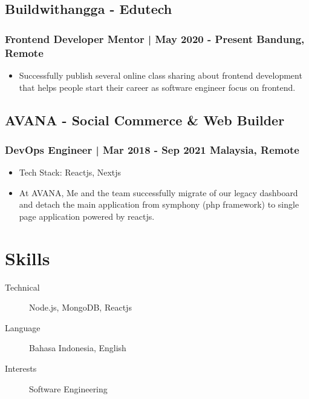 \documentclass[11pt]{article}
\begin{document}
\subsection{Buildwithangga - Edutech}
\subsubsection{Frontend Developer Mentor | May 2020 - Present \hfill Bandung, Remote}
\begin{itemize}
    \item Successfully publish several online class sharing about frontend development that helps people start their career as software engineer focus on frontend.
\end{itemize}

\subsection{AVANA - Social Commerce \& Web Builder}
\subsubsection{DevOps Engineer | Mar 2018 - Sep 2021 \hfill Malaysia, Remote}
\begin{itemize}
    \item Tech Stack: Reactjs, Nextjs
    \item At AVANA, Me and the team successfully migrate of our legacy dashboard and detach the main application from symphony (php framework) to single page application powered by reactjs.
\end{itemize}

\section{Skills}
\begin{description}
    \item[Technical] Node.js, MongoDB, Reactjs
    \item[Language] Bahasa Indonesia, English
    \item[Interests] Software Engineering
\end{description}
\end{document}
